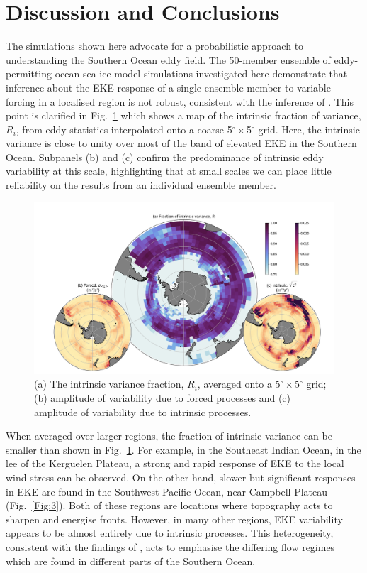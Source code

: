 \documentclass{agujournal2019}
\begin{document}
\section{Discussion and Conclusions}
The simulations shown here advocate for a probabilistic approach to understanding the Southern Ocean eddy field.
The 50-member ensemble of eddy-permitting ocean-sea ice model simulations investigated here demonstrate that inference about the EKE response of a single ensemble member to variable forcing in a localised region is not robust, consistent with the inference of \citet{Zhang2021}.
This point is clarified in Fig.~\ref{Fig:6} which shows a map of the intrinsic fraction of variance, $R_i$, from eddy statistics interpolated onto a coarse 5$^\circ \times$5$^\circ$ grid.
Here, the intrinsic variance is close to unity over most of the band of elevated EKE in the Southern Ocean. 
Subpanels (b) and (c) confirm the predominance of intrinsic eddy variability at this scale, highlighting that at small scales we can place little reliability on the results from an individual ensemble member.

\begin{figure}[t]
\begin{center}
\includegraphics[width=\hsize]{Figure6}
\caption{(a) The intrinsic variance fraction, $R_i$, averaged onto a  5$^\circ \times$5$^\circ$ grid; (b) amplitude of variability due to forced processes and (c) amplitude of variability due to intrinsic processes.}
\label{Fig:6}
\end{center}
\end{figure}

When averaged over larger regions, the fraction of intrinsic variance can be smaller than shown in Fig.~\ref{Fig:6}.
For example, in the Southeast Indian Ocean, in the lee of the Kerguelen Plateau, a strong and rapid response of EKE to the local wind stress can be observed.
On the other hand, slower but significant responses in EKE are found in the Southwest Pacific Ocean, near Campbell Plateau (Fig.~\ref{Fig:3}).
Both of these regions are locations where topography acts to sharpen and energise fronts.
However, in many other regions, EKE variability appears to be almost entirely due to intrinsic processes.
This heterogeneity, consistent with the findings of \citet{Patara2016}, acts to emphasise the differing flow regimes which are found in different parts of the Southern Ocean.
\end{document}

